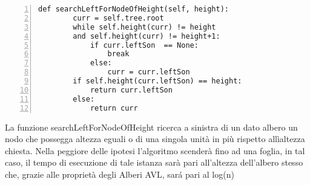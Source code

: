 \begin{minipage}{0.5\linewidth}
   	\begin{Verbatim}[frame=topline,numbers=left,label=Codice,framesep=5mm]
    def searchLeftForNodeOfHeight(self, height):
        curr = self.tree.root
        while self.height(curr) != height 
        and self.height(curr) != height+1: 
            if curr.leftSon  == None:
                break
            else:
                curr = curr.leftSon
        if self.height(curr.leftSon) == height: 
            return curr.leftSon                 
        else:                                   
            return curr
        \end{Verbatim}
\end{minipage}\hfill
\begin{minipage}{0.395\linewidth}
\ttfamily
La funzione searchLeftForNodeOfHeight ricerca a sinistra di un dato albero un nodo che possegga altezza eguali o di una singola unità in più rispetto allìaltezza chiesta. Nella peggiore delle ipotesi l'algoritmo scenderà fino ad una foglia, in tal caso, il tempo di esecuzione di tale istanza sarà pari all'altezza dell'albero stesso che, grazie alle proprietà degli Alberi AVL, sar\'a pari al log(n)
\end{minipage}
\newline
\newline